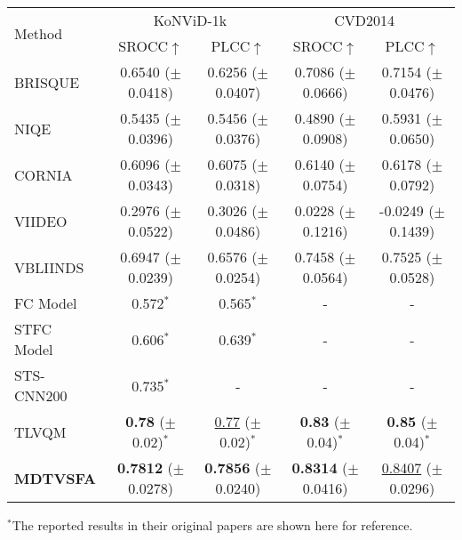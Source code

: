 \documentclass[twocolumn]{svjour3}          \smartqed  \usepackage{graphicx}
\begin{document}
\begin{table*}[!hbt]
\begin{small}
    \bigskip
    
\begin{tabular}{l|cc|cc}
    \toprule
    \multirow{2}{*}{Method} & \multicolumn{2}{c|}{KoNViD-1k~\citep{hosu2017konstanz}} & \multicolumn{2}{c}{CVD2014~\citep{nuutinen2016cvd2014}} \\
    & SROCC$\uparrow$ & PLCC$\uparrow$ & SROCC$\uparrow$ & PLCC$\uparrow$ \Bstrut\\
    \hline
    BRISQUE~\citep{mittal2012no}  & 0.6540 ($\pm$ 0.0418) & 0.6256 ($\pm$ 0.0407)  & 0.7086 ($\pm$ 0.0666) & 0.7154 ($\pm$ 0.0476) \Tstrut\\
    NIQE~\citep{mittal2013making}  & 0.5435 ($\pm$ 0.0396) & 0.5456 ($\pm$ 0.0376) & 0.4890 ($\pm$ 0.0908)  & 0.5931 ($\pm$ 0.0650) \\
    CORNIA~\citep{ye2012unsupervised}  & 0.6096 ($\pm$ 0.0343) & 0.6075 ($\pm$ 0.0318) & 0.6140 ($\pm$ 0.0754) & 0.6178 ($\pm$ 0.0792) \\
    VIIDEO~\citep{mittal2016completely}  & 0.2976 ($\pm$ 0.0522) & 0.3026 ($\pm$ 0.0486)  & 0.0228 ($\pm$ 0.1216) & -0.0249 ($\pm$ 0.1439) \\
    VBLIINDS~\citep{saad2014blind} & 0.6947 ($\pm$ 0.0239) & 0.6576 ($\pm$ 0.0254)  & 0.7458 ($\pm$ 0.0564) & 0.7525 ($\pm$ 0.0528) \\
    FC Model~\citep{men2017empirical} & 0.572$^*$ & 0.565$^*$ & - & -\\
    STFC Model~\citep{men2018spatiotemporal} & 0.606$^*$ & 0.639$^*$ & - & -\\
    STS-CNN200~\citep{yan2019no} & 0.735$^*$ & - & - & -\\
    TLVQM~\citep{korhonen2019two} & \textbf{0.78} ($\pm$ 0.02)$^*$ & \underline{0.77} ($\pm$ 0.02)$^*$  & \textbf{0.83} ($\pm$ 0.04)$^*$ & \textbf{0.85} ($\pm$ 0.04)$^*$  \Bstrut\\
    \hline
    \textbf{MDTVSFA} & \textbf{0.7812} ($\pm$ 0.0278) & \textbf{0.7856} ($\pm$ 0.0240) & \textbf{0.8314} ($\pm$ 0.0416) & \underline{0.8407} ($\pm$ 0.0296) \Tstrut\\
    \bottomrule
    \end{tabular}


    \vspace{1mm}
    
    $^*$The reported results in their original papers are shown here for reference.
    \end{small}
\end{table*}
\end{document}
